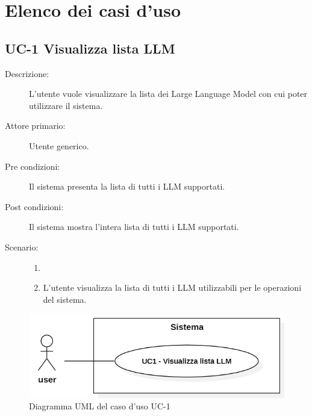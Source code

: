 \newpage

\section{Elenco dei casi d'uso}

\subsection{UC-1 Visualizza lista LLM}
\begin{description}
    \item[Descrizione:] L’utente vuole visualizzare la lista dei Large Language Model con cui poter utilizzare il sistema.
    \item[Attore primario:] Utente generico.
    \item[Pre condizioni:] Il sistema presenta la lista di tutti i LLM supportati.
    \item[Post condizioni:] Il sistema mostra l’intera lista di tutti i LLM supportati.
    \item[Scenario:] 
    \begin{enumerate}
        \item[]
        \item L’utente visualizza la lista di tutti i LLM utilizzabili per le operazioni del sistema.
    \end{enumerate}
\end{description}

\begin{figure}[H]
    \centering
    \includegraphics[width=0.8\linewidth]{UC1.PNG}
    \caption{Diagramma UML del caso d'uso UC-1}
\end{figure}

